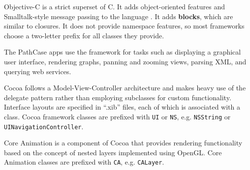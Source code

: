 Objective-C is a strict superset of C. It adds object-oriented features and
Smalltalk-style message passing to the language \cite{???}. It adds
\textbf{blocks}, which are similar to closures. It does not provide namespace
features, so most frameworks choose a two-letter prefix for all classes they
provide.

The PathCase apps use the framework for tasks such as displaying a graphical
user interface, rendering graphs, panning and zooming views, parsing XML, and
querying web services.

Cocoa follows a Model-View-Controller architecture and makes heavy use of the
delegate pattern rather than employing subclasses for custom functionality.
Interface layouts are specified in ``.xib'' files, each of which is associated
with a class. \cite{ios:application-programming-guide} Cocoa framework classes
are prefixed with \texttt{UI} or \texttt{NS}, e.g. \texttt{NSString} or
\texttt{UINavigationController}.

Core Animation is a component of Cocoa that provides rendering functionality
based on the concept of nested layers implemented using OpenGL.
\cite{ios:core-animation} Core Animation classes are prefixed with \texttt{CA},
e.g. \texttt{CALayer}.
